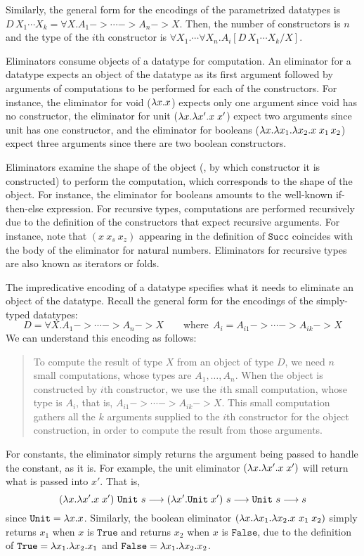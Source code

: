 Similarly, the general form for the encodings of the parametrized datatypes is
$D\,X_1 \cdots X_k = \forall X. A_1 -> \cdots -> A_n -> X$. Then,
the number of constructors is $n$ and the type of the $i$th constructor
is $\forall X_1.\cdots\forall X_n.A_i[D\,X_1 \cdots X_k / X]$.

Eliminators consume objects of a datatype for computation.
An eliminator for a datatype expects an object of the datatype
as its first argument followed by arguments of computations
to be performed for each of the constructors. For instance, the eliminator
for void ($\lambda x.x$) expects only one argument since void has
no constructor, the eliminator for unit ($\lambda x.\lambda x'.x\;x'$) expect
two arguments since unit has one constructor, and the eliminator for booleans
($\lambda x.\lambda x_1. \lambda x_2. x\;x_1\,x_2$) expect three arguments since there are
two boolean constructors.

Eliminators examine the shape of the object (\ie, by which constructor it is
constructed) to perform the computation, which corresponds to the shape
of the object. For instance, the eliminator for booleans amounts to the
well-known if-then-else expression.
For recursive types, computations are performed recursively due to
the definition of the constructors that expect recursive arguments.
For instance, note that $(x~x_s~x_z)$ appearing in the definition of
$\mathtt{Succ}$ coincides with the body of the eliminator for natural numbers.
Eliminators for recursive types are also known as iterators or folds.

The impredicative encoding of a datatype specifies what it needs to eliminate
an object of the datatype. Recall the general form for the encodings of
the simply-typed datatypes:
\[D = \forall X. A_1 -> \cdots -> A_n -> X
        \qquad\text{where}~~ A_i = A_{i1} -> \cdots -> A_{ik} -> X \]
We can understand this encoding as follows:
\begin{quote}
To compute the result of type $X$ from an object of type $D$,
we need $n$ small computations, whose types are $A_1,\dots,A_n$.
When the object is constructed by $i$th constructor, we use the $i$th small
computation, whose type is $A_i$, that is, $A_{i1} -> \cdots -> A_{ik} -> X$.
This small computation gathers all the $k$ arguments supplied to
the $i$th constructor for the object construction, in order to
compute the result from those arguments.
\end{quote}

For constants, the eliminator simply returns the argument being passed
to handle the constant, as it is. For example, the unit eliminator
$(\lambda x .\lambda x'.x\;x')$ will return what is passed into $x'$. That is,
\[   (\lambda x .\lambda x'.x\;x')~\mathtt{Unit}~s
 --> (\lambda x'.\mathtt{Unit}\;x')~s
 --> \mathtt{Unit}~s
 --> s
\] since $\texttt{Unit}=\lambda x.x$.
Similarly, the boolean eliminator $(\lambda x.\lambda x_1.\lambda x_2.x~x_1\;x_2)$
simply returns $x_1$ when $x$ is $\mathtt{True}$
and returns $x_2$ when $x$ is $\mathtt{False}$,
due to the definition of $\mathtt{True} = \lambda x_1.\lambda x_2. x_1$
and $\mathtt{False} = \lambda x_1.\lambda x_2. x_2$.

